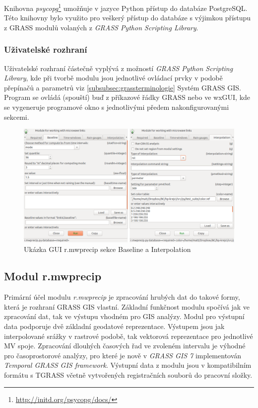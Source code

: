 \documentclass[a4paper,12pt,oneside]{report}
\begin{document}
Knihovna \textit{psycopg}\footnote{\url{http://initd.org/psycopg/docs/}}
umožňuje v jazyce Python přístup do databáze PostgreSQL. Této knihovny
bylo využito pro veškerý přístup do databáze s výjimkou přístupu z GRASS
modulů volaných z \textit{GRASS Python Scripting Library}.

\subsubsection{Uživatelské rozhraní}
Uživatelské rozhraní částečně vyplývá z možností \textit{GRASS Python
  Scripting Library}, kde při tvorbě modulu jsou jednotlivé ovládací
prvky v podobě přepínačů a
parametrů viz \ref{subsubsec:grassterminologie} Systém GRASS GIS. Program se ovládá
(spouští) buď z příkazové řádky GRASS nebo ve wxGUI, kde se vygeneruje
programové okno s jednotlivými předem nakonfigurovanými sekcemi.

\begin{figure}[h!]
    \centering
    \includegraphics[width=\textwidth]{./img/grass/gui.png}
    \caption[GUI modul]{Ukázka GUI r.mwprecip sekce Baseline a Interpolation  \centering  }
        \label{fig:baseline}
 \end{figure}

\subsection{Modul r.mwprecip}
Primární účel modulu \textit{r.mwprecip} je zpracování hrubých dat do
takové formy, která je rozhraní GRASS GIS vlastní. Základní funkčnost
modulu spočívá jak ve zpracování dat, tak ve výstupu vhodném pro GIS
analýzy. Modul pro výstupní data podporuje dvě základní geodatové
reprezentace. Výstupem jsou jak interpolované srážky v rastrové
podobě, tak vektorová reprezentace pro jednotlivé MV spoje.
Zpracování dlouhých časových řad ve zvoleném intervalu je výhodné pro
časoprostorové analýzy, pro které je nově v \textit{GRASS GIS 7}
implementován \textit{Temporal GRASS GIS framework}. Výstupní data z
modulu jsou v kompatibilním formátu s TGRASS včetně vytvořených
registračních souborů do pracovní složky.
\end{document}
